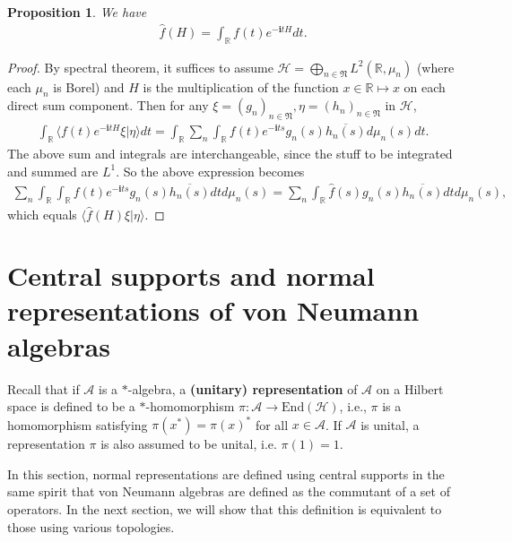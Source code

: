 \documentclass[12pt,b5paper,notitlepage]{article}
\theoremstyle{definition}
\theoremstyle{plain}
\newtheorem{pp}[df]{Proposition}
\newcommand{\fk}{\mathfrak}
\newcommand{\mc}{\mathcal}
\newcommand{\wht}{\widehat}
\newcommand{\ovl}{\overline}
\newcommand{\End}{\mathrm{End}} %
\newcommand{\bk}[1]{\langle {#1}\rangle}
\newcommand{\scr}{\mathscr}
\newcommand{\im}{\mathbf{i}}
\newcommand{\Rbb}{\mathbb R}
\numberwithin{equation}{section}
\begin{document}
\begin{pp}
We have
\begin{align*}
\wht f(H)=	\int_\Rbb f(t)e^{-\im tH}dt.
\end{align*}
\end{pp}



\begin{proof}
By spectral theorem, it suffices to assume $\mc H=\bigoplus_{n\in\fk N}L^2(\Rbb,\mu_n)$ (where each $\mu_n$ is Borel) and $H$ is the multiplication of the function $x\in\Rbb\mapsto x$ on each direct sum component. Then for any $\xi=(g_n)_{n\in\fk N},\eta=(h_n)_{n\in\fk N}$ in $\mc H$, 
\begin{align*}
\int_\Rbb\bk{f(t)e^{-\im tH}\xi|\eta}dt=\int_\Rbb\sum_n \int_\Rbb f(t)e^{-\im ts}g_n(s)\ovl{h_n(s)}d\mu_n(s)dt.	
\end{align*}
The above sum and integrals are interchangeable, since the stuff to be integrated and summed are $L^1$. So the above expression becomes
\begin{align*}
\sum_n \int_\Rbb \int_\Rbb f(t)e^{-\im ts}g_n(s)\ovl{h_n(s)}dt d\mu_n(s)=	\sum_n \int_\Rbb  \wht f(s)g_n(s)\ovl{h_n(s)}dt d\mu_n(s),
\end{align*}
which equals $\bk{\wht f(H)\xi|\eta}$.
\end{proof}













\section{Central supports and normal representations of von Neumann algebras}


Recall that if $\scr A$ is a $*$-algebra, a \textbf{(unitary) representation} of $\scr A$ on a Hilbert space is defined to be a $*$-homomorphism $\pi:\scr A\rightarrow\End(\mc H)$, i.e., $\pi$ is a homomorphism satisfying $\pi(x^*)=\pi(x)^*$ for all $x\in\scr A$. If $\scr A$ is unital, a representation $\pi$ is also assumed to be unital, i.e. $\pi(1)=1$.


In this section, normal representations are defined using central supports in the same spirit that von Neumann algebras are defined as the commutant of a set of operators. In the next section, we will show that this definition is equivalent to those using various topologies.
\end{document}
